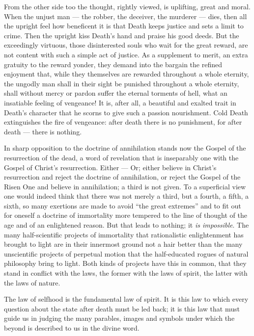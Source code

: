 \documentclass[12pt,a4paper,openany]{book}
\newcommand{\opage}[1]{\marginnote{\footnotesize\textit{[#1]}}}
\begin{document}
From the other side too the thought, rightly viewed, is
uplifting, great and moral. When the unjust man ---
the robber, the deceiver, the murderer --- dies, then all
the upright feel how beneficent it is that Death keeps justice
and sets a limit to crime. Then the
upright kiss Death's hand and praise his good deeds.
But the exceedingly virtuous, those disinterested souls who
wait for the great reward, are not content with such a
simple act of justice. As a supplement to merit,
an extra gratuity to the reward yonder, they demand
into the bargain the refined enjoyment that, while they themselves are
rewarded throughout a whole eternity, the ungodly man shall in
their sight be punished throughout a whole eternity, shall without
mercy or pardon suffer the eternal torments of hell,
what an insatiable feeling of vengeance! It is, after all, a beautiful and
exalted trait in Death's character that he scorns to
give such a passion nourishment. Cold Death extinguishes
the fire of vengeance: after death there is no punishment, for
after death --- there is nothing.

In sharp opposition to the doctrine of annihilation stands
\setcounter{footnote}{0}%
\opage{207}now the Gospel of the resurrection of the dead, a word of revelation
that is inseparably one with the Gospel of
Christ's resurrection. Either --- Or; either believe in
Christ's resurrection and reject the doctrine of annihilation, or
reject the Gospel of the Risen One and believe in annihilation;
a third is not given. To a superficial
view one would indeed think that there was
not merely a third, but a fourth, a fifth, a sixth, so
many exertions are made to avoid ``the
great extremes'' and to fit out for oneself a doctrine of immortality
more tempered to the line of thought of the age and of an enlightened reason.
But that leads to nothing; it \emph{is impossible}. The many
half-scientific projects of immortality that rationalistic
enlightenment has brought to light are in their
innermost ground not a hair better than the many unscientific
projects of perpetual motion that the half-educated
rogues of natural philosophy bring to light. Both
kinds of projects have this in common, that they stand in conflict
with the laws, the former with the laws of spirit, the latter with the
laws of nature.

The law of selfhood is the fundamental law of spirit. It is this
law to which every question about the state after death
must be led back; it is this law that must guide
us in judging the many parables, images
and symbols under which the beyond is described to us
in the divine word.
\end{document}

